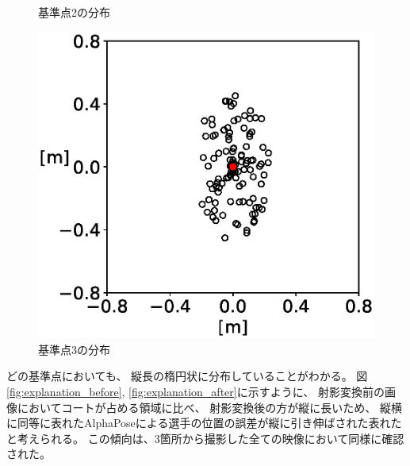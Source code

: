 \documentclass[a4j, fleqn, 12pt]{jsreport}
\begin{document}
\begin{figure}[ht]
\begin{minipage}{0.32\hsize}
                    \caption{基準点2の分布}
                    \label{fig:distribution2}
                \end{minipage}
                \begin{minipage}{0.32\hsize}
                    \centering
                    \includegraphics[width=1\hsize]{images/dist3.eps}
                    \caption{基準点3の分布}
                    \label{fig:distribution3}
                \end{minipage}
            \end{figure}

            どの基準点においても、
            縦長の楕円状に分布していることがわかる。
            図\ref{fig:explanation_before}, \ref{fig:explanation_after}に示すように、
            射影変換前の画像においてコートが占める領域に比べ、
            射影変換後の方が縦に長いため、
            縦横に同等に表れたAlphaPoseによる選手の位置の誤差が縦に引き伸ばされた表れたと考えられる。
            この傾向は、3箇所から撮影した全ての映像において同様に確認された。
\end{document}
